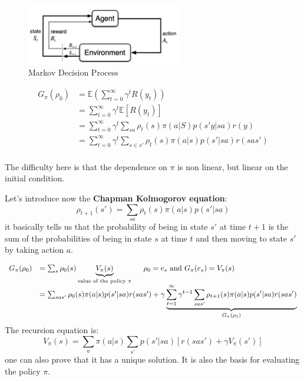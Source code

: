 \begin{figure}[H]
    \centering
    \includegraphics[width=0.6\textwidth]{assets/fig1.png}
    \caption{Markov Decision Process}
    \label{fig:fig1}
\end{figure}

$$
\begin{array}{rl}
    G_{\pi}(\rho_0) 
    & = \mathbb{E} \left( \sum_{t=0}^{\infty} \gamma^t R(y_t) \right)\\
    & = \sum_{t=0}^{\infty} \gamma^t \mathbb{E} \left[ R(y_t) \right] \\
    & = \sum_{t=0}^{\infty} \gamma^t \sum_{sa}\rho_t(s)\pi(a|S)p(s'y|sa)r(y) \\
    & = \sum_{t=0}^{\infty} \gamma^t \sum_{s\in s'}\rho_t(s)\pi(a|s)p(s'|sa)r(sas') \\
\end{array}
$$

The difficulty here is that the dependence on $\pi$ is non linear, but linear on the initial condition. 

Let's introduce now the \textbf{Chapman Kolmogorov equation}:
$$
\rho_{t+1}(s') = \sum_{sa}\rho_t(s)\pi(a|s)p(s'|sa)
$$
it basically tells us that the probability of being in state $s'$ at time $t+1$ is the sum of the probabilities of being in state $s$ at time $t$ and then moving to state $s'$ by taking action $a$.

$$
\begin{array}{rl}
    G_{\pi}(\rho_0) 
    & = \sum_{s}\rho_0(s)\underbrace{V_{\pi}(s)}_{\text{value of the policy $\pi$}} \hspace{0.5cm} \rho_0 = e_s \text{ and } G_{\pi}(e_s) = V_{\pi}(s)\\
    & = \sum_{sas'}\rho_0(s)\pi(a|s)p(s'|sa)r(sas') + \gamma \underbrace{\sum_{t=1}^{\infty}\gamma^{t-1}\sum_{sas'}\rho_{t+1}(s)\pi(a|s)p(s'|sa)r(sas')}_{G_{\pi}(\rho_1)} \\
\end{array}
$$
The recursion equation is:
$$
V_{\pi}(s) = \sum_{a}\pi(a|s)\sum_{s'}p(s'|sa)[r(sas') + \gamma V_{\pi}(s')]
$$
one can also prove that it has a unique solution.
It is also the basis for evaluating the policy $\pi$.


